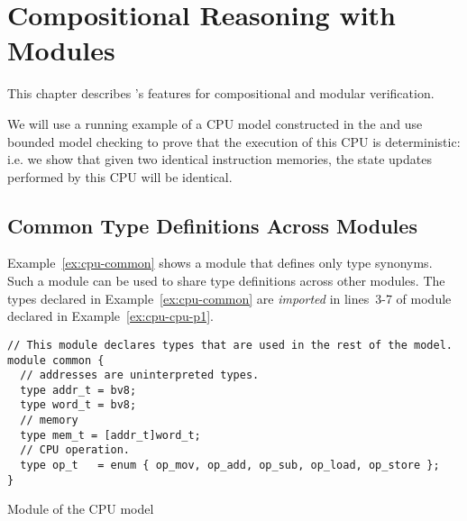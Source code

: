 \chapter{Compositional Reasoning with Modules}
This chapter describes \uclid{}'s features for compositional and modular verification.

We will use a running example of a CPU model constructed in the \uclid{} and use bounded model checking to prove that the execution of this CPU is deterministic: i.e. we show that given two identical instruction memories, the state updates performed by this CPU will be identical.

\section{Common Type Definitions Across Modules}
Example~\ref{ex:cpu-common} shows a module that defines only type synonyms. Such a module can be used to share type definitions across other modules. The types declared in Example~\ref{ex:cpu-common} are \emph{imported} in lines~3-7 of module  declared in Example~\ref{ex:cpu-cpu-p1}.

\label{sec:cpu-model}
\begin{uclidlisting}[htbp]
\begin{lstlisting}[language=uclid,style=uclidstyle]
// This module declares types that are used in the rest of the model.
module common {
  // addresses are uninterpreted types.
  type addr_t = bv8;
  type word_t = bv8;
  // memory
  type mem_t = [addr_t]word_t;
  // CPU operation.
  type op_t   = enum { op_mov, op_add, op_sub, op_load, op_store };
}
\end{lstlisting}
\caption{Module  of the CPU model}
\label{ex:cpu-common}
\end{uclidlisting}

